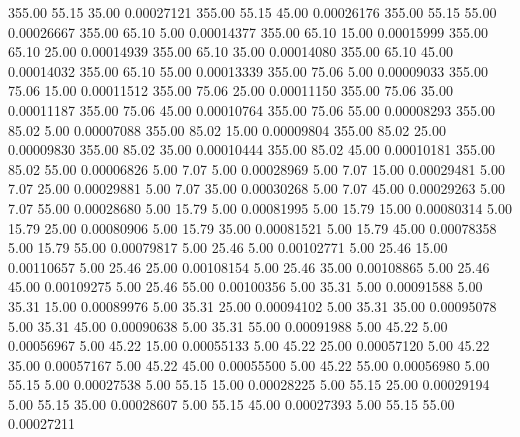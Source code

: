     355.00     55.15     35.00     0.00027121
    355.00     55.15     45.00     0.00026176
    355.00     55.15     55.00     0.00026667
    355.00     65.10      5.00     0.00014377
    355.00     65.10     15.00     0.00015999
    355.00     65.10     25.00     0.00014939
    355.00     65.10     35.00     0.00014080
    355.00     65.10     45.00     0.00014032
    355.00     65.10     55.00     0.00013339
    355.00     75.06      5.00     0.00009033
    355.00     75.06     15.00     0.00011512
    355.00     75.06     25.00     0.00011150
    355.00     75.06     35.00     0.00011187
    355.00     75.06     45.00     0.00010764
    355.00     75.06     55.00     0.00008293
    355.00     85.02      5.00     0.00007088
    355.00     85.02     15.00     0.00009804
    355.00     85.02     25.00     0.00009830
    355.00     85.02     35.00     0.00010444
    355.00     85.02     45.00     0.00010181
    355.00     85.02     55.00     0.00006826
      5.00      7.07      5.00     0.00028969
      5.00      7.07     15.00     0.00029481
      5.00      7.07     25.00     0.00029881
      5.00      7.07     35.00     0.00030268
      5.00      7.07     45.00     0.00029263
      5.00      7.07     55.00     0.00028680
      5.00     15.79      5.00     0.00081995
      5.00     15.79     15.00     0.00080314
      5.00     15.79     25.00     0.00080906
      5.00     15.79     35.00     0.00081521
      5.00     15.79     45.00     0.00078358
      5.00     15.79     55.00     0.00079817
      5.00     25.46      5.00     0.00102771
      5.00     25.46     15.00     0.00110657
      5.00     25.46     25.00     0.00108154
      5.00     25.46     35.00     0.00108865
      5.00     25.46     45.00     0.00109275
      5.00     25.46     55.00     0.00100356
      5.00     35.31      5.00     0.00091588
      5.00     35.31     15.00     0.00089976
      5.00     35.31     25.00     0.00094102
      5.00     35.31     35.00     0.00095078
      5.00     35.31     45.00     0.00090638
      5.00     35.31     55.00     0.00091988
      5.00     45.22      5.00     0.00056967
      5.00     45.22     15.00     0.00055133
      5.00     45.22     25.00     0.00057120
      5.00     45.22     35.00     0.00057167
      5.00     45.22     45.00     0.00055500
      5.00     45.22     55.00     0.00056980
      5.00     55.15      5.00     0.00027538
      5.00     55.15     15.00     0.00028225
      5.00     55.15     25.00     0.00029194
      5.00     55.15     35.00     0.00028607
      5.00     55.15     45.00     0.00027393
      5.00     55.15     55.00     0.00027211
